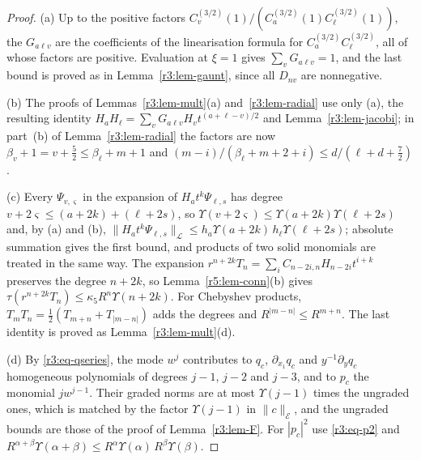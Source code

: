 \documentclass[11pt]{amsart}
\theoremstyle{definition}
\theoremstyle{remark}
\numberwithin{equation}{section}
\newcommand{\nrm}[1]{\lVert #1\rVert}
\begin{document}
\begin{proof}
(a) Up to the positive factors $C^{(3/2)}_v(1)/(C^{(3/2)}_a(1)C^{(3/2)}_\ell(1))$, the $G_{a\ell v}$ are the coefficients of the linearisation formula \cite[18.18.22]{DLMF} for $C^{(3/2)}_aC^{(3/2)}_\ell$, all of whose factors are positive. Evaluation at $\xi=1$ gives $\sum_vG_{a\ell v}=1$, and the last bound is proved as in Lemma~\ref{r3:lem-gaunt}, since all $D_{nv}$ are nonnegative.

(b) The proofs of Lemmas~\ref{r3:lem-mult}(a) and~\ref{r3:lem-radial} use only (a), the resulting identity $H_aH_\ell=\sum_vG_{a\ell v}H_vt^{(a+\ell-v)/2}$ and Lemma~\ref{r3:lem-jacobi}; in part~(b) of Lemma~\ref{r3:lem-radial} the factors are now $\beta_v+1=v+\frac52\leq\beta_\ell+m+1$ and $(m-i)/(\beta_\ell+m+2+i)\leq d/(\ell+d+\frac72)$.

(c) Every $\Psi_{v,\varsigma}$ in the expansion of $H_at^k\Psi_{\ell,s}$ has degree $v+2\varsigma\leq(a+2k)+(\ell+2s)$, so $\Upsilon(v+2\varsigma)\leq\Upsilon(a+2k)\Upsilon(\ell+2s)$ and, by (a) and (b), $\nrm{H_at^k\Psi_{\ell,s}}_{\mathcal L}\leq h_a\Upsilon(a+2k)\,h_\ell\Upsilon(\ell+2s)$; absolute summation gives the first bound, and products of two solid monomials are treated in the same way. The expansion $r^{n+2k}T_n=\sum_iC_{n-2i,n}H_{n-2i}t^{i+k}$ preserves the degree $n+2k$, so Lemma~\ref{r5:lem-conn}(b) gives $\tau(r^{n+2k}T_n)\leq\kappa_5R^n\Upsilon(n+2k)$. For Chebyshev products, $T_mT_n=\frac12(T_{m+n}+T_{|m-n|})$ adds the degrees and $R^{|m-n|}\leq R^{m+n}$. The last identity is proved as Lemma~\ref{r3:lem-mult}(d).

(d) By \eqref{r3:eq-qseries}, the mode $w^j$ contributes to $q_c$, $\partial_{x_1}q_c$ and $y^{-1}\partial_yq_c$ homogeneous polynomials of degrees $j-1$, $j-2$ and $j-3$, and to $p_c$ the monomial $jw^{j-1}$. Their graded norms are at most $\Upsilon(j-1)$ times the ungraded ones, which is matched by the factor $\Upsilon(j-1)$ in $\nrm c_{\mathcal E}$, and the ungraded bounds are those of the proof of Lemma~\ref{r3:lem-F}. For $|p_c|^2$ use \eqref{r3:eq-p2} and $R^{\alpha+\beta}\Upsilon(\alpha+\beta)\leq R^\alpha\Upsilon(\alpha)\,R^\beta\Upsilon(\beta)$.
\end{proof}
\end{document}
